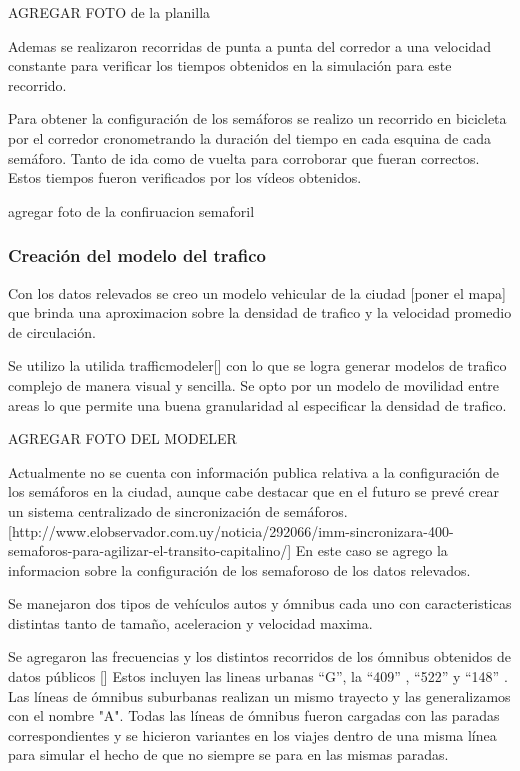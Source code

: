 AGREGAR FOTO de la planilla

Ademas se realizaron recorridas de punta a punta del corredor a una velocidad constante para verificar los tiempos obtenidos en la simulación para este recorrido.

Para obtener la configuración de los semáforos se realizo un recorrido en bicicleta por el corredor cronometrando la duración del tiempo en cada esquina de cada semáforo. Tanto de ida como de vuelta para corroborar que fueran correctos. Estos tiempos fueron verificados por los vídeos obtenidos.

agregar foto de la confiruacion semaforil


\subsubsection{Creación del modelo del trafico}

Con los datos relevados se creo un modelo vehicular de la ciudad [poner el mapa] que brinda una aproximacion sobre la densidad de trafico y la velocidad promedio de circulación.

Se utilizo la utilida trafficmodeler[] con lo que se logra generar modelos de trafico complejo de manera visual y sencilla. Se opto por un modelo de movilidad entre areas lo que permite una buena granularidad al especificar la densidad de trafico.

AGREGAR FOTO DEL MODELER

Actualmente no se cuenta con información publica relativa a la configuración de los semáforos en la ciudad, aunque cabe destacar que en el futuro se prevé crear un sistema centralizado de sincronización de semáforos.  [http://www.elobservador.com.uy/noticia/292066/imm-sincronizara-400-semaforos-para-agilizar-el-transito-capitalino/] 
En este caso se agrego la informacion sobre la configuración de los semaforoso de los datos relevados.

Se manejaron dos tipos de vehículos autos y ómnibus cada uno con caracteristicas distintas tanto de tamaño, aceleracion y velocidad maxima.

Se agregaron las frecuencias y los distintos recorridos de los ómnibus obtenidos de datos públicos []
Estos incluyen las lineas urbanas  “G”,  la  “409” , “522”  y  “148” . Las líneas de ómnibus suburbanas realizan  un mismo  trayecto y las generalizamos con el nombre "A".  
Todas  las  líneas  de  ómnibus
fueron cargadas con las paradas correspondientes y se
hicieron  variantes  en  los  viajes  dentro  de  una  misma
línea para simular el hecho de que no siempre se para en las mismas paradas.



